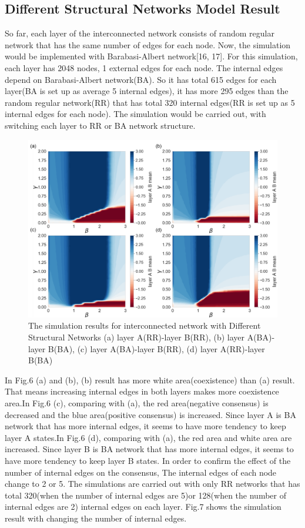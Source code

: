\documentclass[english]{cccconf}
\begin{document}
\subsection{Different Structural Networks Model Result}
So far, each layer of the interconnected network consists of random regular network that has the same number of edges for each node. Now, the simulation would be implemented with Barabasi-Albert network[16, 17]. For this simulation, each layer has 2048 nodes, 1 external edges for each node. The internal edges depend on Barabasi-Albert network(BA). So it has total 615 edges for each layer(BA is set up as average 5 internal edges), it has more 295 edges than the random regular network(RR) that has total 320 internal edges(RR is set up as 5 internal edges for each node). The simulation would be carried out, with switching each layer to RR or BA network structure.
\begin{figure}[!htb]
  \centering
  \includegraphics[width=\hsize]{FIG6.png}
  \caption{The simulation results for interconnected network with Different Structural Networks (a) layer A(RR)-layer B(RR), (b) layer A(BA)-layer B(BA), (c) layer A(BA)-layer B(RR), (d) layer A(RR)-layer B(BA)}
  \label{Fig6}
\end{figure}
In Fig.6 (a) and (b), (b) result has more white area(coexistence) than (a) result. That means increasing internal edges in both layers makes more coexistence area.In Fig.6 (c), comparing with (a), the red area(negative consensus) is decreased and the blue area(positive consensus) is increased. Since layer A is BA network that has more internal edges, it seems to have more tendency to keep layer A states.In Fig.6 (d), comparing with (a), the red area and white area are increased. Since layer B is BA network that has more internal edges, it seems to have more tendency to keep layer B states. In order to confirm the effect of the number of internal edges on the consensus, The internal edges of each node change to 2 or 5. The simulations are carried out with only RR networks that has total 320(when the number of internal edges are 5)or 128(when the number of internal edges are 2) internal edges on each layer. Fig.7 shows the simulation result with changing the number of internal edges.
\end{document}
